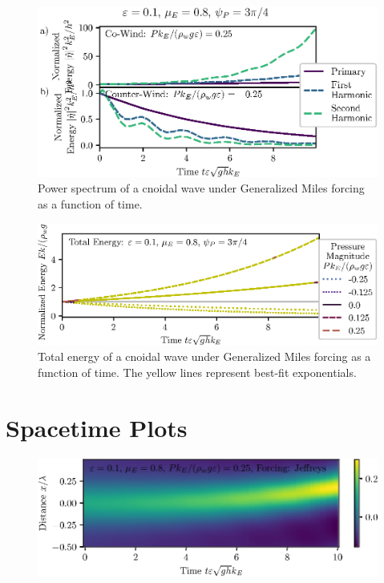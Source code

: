 \documentclass{jfm}
\let\Oldsection\section
\renewcommand{\section}{\FloatBarrier\Oldsection}
\begin{document}
\begin{figure}
  \centering
  \includegraphics{Power-Spectrum-vs-Time-GM.eps}
  \caption{
    Power spectrum of a cnoidal wave under Generalized Miles forcing as a
    function of time.
  }
\end{figure}

\begin{figure}
  \centering
  \includegraphics{Total-Energy-GM.eps}
  \caption{
    Total energy of a cnoidal wave under Generalized Miles forcing as a
    function of time. The yellow lines represent best-fit exponentials.
  }
\end{figure}

\section{Spacetime Plots}
\begin{figure}
  \centering
  \includegraphics{Spacetime-Mesh.eps}
  \caption{}
\end{figure}
\end{document}
